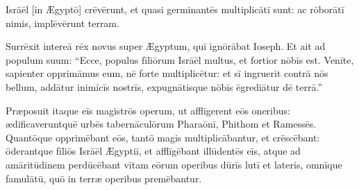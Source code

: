 

\thispagestyle{empty}


 Isrāēl [in Ægyptō] crēvērunt, et quasi germinantēs multiplicātī sunt:
ac rōborātī nimis, implēvērunt terram.

Surrēxit intereā rēx novus super Ægyptum, quī ignōrābat Ioseph.
Et ait ad populum suum: ``Ecce, populus fīliōrum Isrāēl multus, et fortior nōbīs est.
Venīte, sapien\-ter opprimāmus eum, nē forte multiplicētur: et sī ingruerit contrā nōs bellum, addātur inimīcīs nostrīs, expugnātisque nōbīs ēgrediātur dē terrā.''

Præposuit itaque eīs magistrōs operum, ut afflīgerent eōs oneribus: 
ædificaveruntquē urbēs tabernāculōrum Pharaōnī, Phithom et Ramessēs.
Quantōque opprimēbant eōs, tantō magis multiplicābantur, et crēscēbant: 
ōderantque fīliōs Isrāēl Ægyptiī, et afflīgēbant illūdentēs eīs,
atque ad amāritūdinem perdūcēbant vītam eōrum operibus dūrīs lutī et lateris, omnīque famulātū, quō in terræ operibus premēbantur. 

